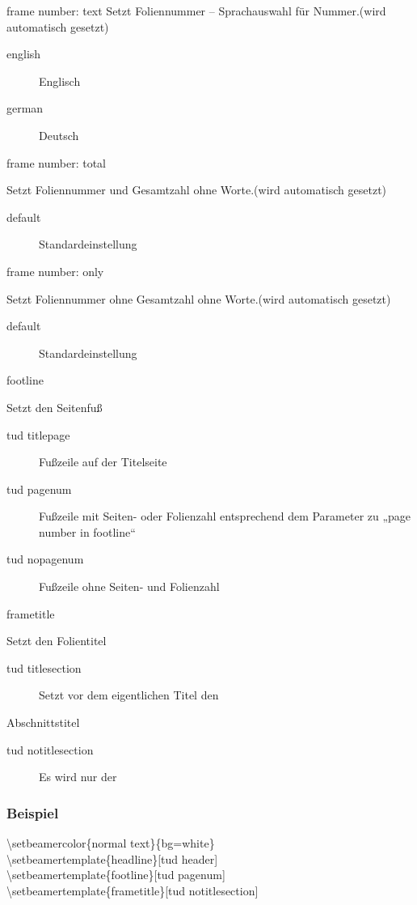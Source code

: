 \documentclass[presentation,t]{beamer}
\begin{document}
\begin{frame}[allowframebreaks]
\begin{block}{frame number: text}
Setzt Foliennummer – Sprachauswahl für Nummer.(wird automatisch gesetzt)
\begin{description}
\item[english] Englisch
\item[german] Deutsch
\end{description}
\end{block}
\begin{block}{frame number: total}
\label{sec-2-2-5-7}

Setzt Foliennummer und Gesamtzahl ohne Worte.(wird automatisch gesetzt)
\begin{description}
\item[default] Standardeinstellung
\end{description}
\end{block}
\begin{block}{frame number: only}
\label{sec-2-2-5-8}

Setzt Foliennummer ohne  Gesamtzahl ohne Worte.(wird automatisch gesetzt)
\begin{description}
\item[default] Standardeinstellung
\end{description}
\end{block}
\begin{block}{footline}
\label{sec-2-2-5-9}

Setzt den Seitenfuß

\begin{description}
\item[tud titlepage] Fußzeile auf der Titelseite
\item[tud pagenum] Fußzeile mit Seiten- oder Folienzahl entsprechend dem
   Parameter zu „page number in footline“
\item[tud nopagenum] Fußzeile ohne Seiten- und Folienzahl
\end{description}
\end{block}
\begin{block}{frametitle}
\label{sec-2-2-5-10}

Setzt den Folientitel
\begin{description}
\item[tud titlesection] Setzt vor dem eigentlichen Titel den
\end{description}
Abschnittstitel
\begin{description}
\item[tud notitlesection] Es wird nur der
\end{description}
\end{block}
\end{frame}
\begin{frame}
\frametitle{Beispiel}
\label{sec-2-2-6}


    \textbackslash setbeamercolor\{normal text\}\{bg=white\}\\
    \textbackslash setbeamertemplate\{headline\}[tud header]\\
    \textbackslash setbeamertemplate\{footline\}[tud pagenum]\\
    \textbackslash setbeamertemplate\{frametitle\}[tud notitlesection]\\
 
\end{frame}
\end{document}
